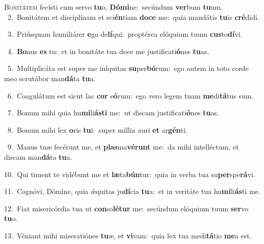 \lettrine{\initial\textcolor{\initialcolor}{B}}{onitátem} fecísti cum servo \textbf{tu}\-o, \textbf{Dó}\-\textbf{mi}ne:~\star secúndum \textbf{ver}\-bum \textbf{tu}\-um.\\
{\numbfont\textcolor{\numbcolor}{~2.}}~Bonitátem et disciplínam et sci\-\textbf{én}\-tiam \textbf{do}\-\textbf{ce} me:~\star quia mandátis \textbf{tu}\-is \textbf{cré}\-didi.\par
{\numbfont\textcolor{\numbcolor}{~3.}}~Priúsquam humiliárer \textbf{e}\-go de\-\textbf{lí}\-qui:~\star proptérea elóquium tuum \textbf{cus}\-to\-\textbf{dí}\-vi.\par
{\numbfont\textcolor{\numbcolor}{~4.}}~\-\textbf{Bo}\-nus \textbf{es} tu:~\star et in bonitáte tua doce me justificati\-\textbf{ó}\-nes \textbf{tu}\-as.\par
{\numbfont\textcolor{\numbcolor}{~5.}}~Multiplicáta est super me iníquitas \textbf{su}\-per\-\textbf{bó}\-rum:~\star ego autem in toto corde meo scrutábor man\-\textbf{dá}\-ta \textbf{tu}\-a.\par
{\numbfont\textcolor{\numbcolor}{~6.}}~Coagulátum est sicut lac \textbf{cor} e\-\textbf{ó}\-rum:~\star ego vero legem tuam \textbf{me}\-di\-\textbf{tá}\-tus sum.\par
{\numbfont\textcolor{\numbcolor}{~7.}}~Bonum mihi quia hu\-\textbf{mi}\-li\-\textbf{ás}\-\textbf{ti} me:~\star ut discam justificati\-\textbf{ó}\-nes \textbf{tu}\-as.\par
{\numbfont\textcolor{\numbcolor}{~8.}}~Bonum mihi lex \textbf{o}\-ris \textbf{tu}\-i:~\star super míllia auri \textbf{et} ar\-\textbf{gén}\-ti.\par
{\numbfont\textcolor{\numbcolor}{~9.}}~Manus tuæ fecérunt me, et \textbf{plas}\-ma\-\textbf{vé}\-\textbf{runt} me:~\star da mihi intelléctum, et discam man\-\textbf{dá}\-ta \textbf{tu}\-a.\par
{\numbfont\textcolor{\numbcolor}{10.}}~Qui timent te vidébunt me et \textbf{læ}\-ta\-\textbf{bún}\-tur:~\star quia in verba tua su\-\textbf{per}\-spe\-\textbf{rá}\-vi.\par
{\numbfont\textcolor{\numbcolor}{11.}}~Cognóvi, Dómine, quia ǽquitas ju\-\textbf{dí}\-cia \textbf{tu}\-a:~\star et in veritáte tua hu\-\textbf{mi}\-li\-\textbf{ás}\-ti me.\par
{\numbfont\textcolor{\numbcolor}{12.}}~Fiat misericórdia tua ut \textbf{con}\-so\-\textbf{lé}\-\textbf{tur} me:~\star secúndum elóquium tuum \textbf{ser}\-vo \textbf{tu}\-o.\par
{\numbfont\textcolor{\numbcolor}{13.}}~Véniant mihi miseratiónes \textbf{tu}\-æ, et \textbf{vi}\-vam:~\star quia lex tua medi\-\textbf{tá}\-tio \textbf{me}\-a est.\par

